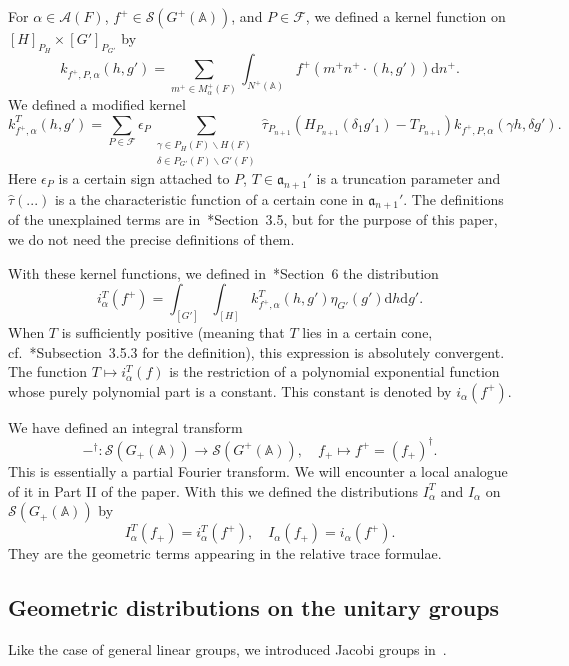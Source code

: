 \documentclass[letterpaper,11pt]{amsart}
\newcommand{\fa}{\mathfrak{a}}
\newcommand{\bA}{\mathbb{A}}
\newcommand{\cA}{\mathcal{A}}
\newcommand{\cF}{\mathcal{F}}
\newcommand{\cS}{\mathcal{S}}
\newcommand{\rd}{\mathrm{d}}
\newcommand{\bs}{\backslash}
\newcommand{\<}{\negthickspace}
\theoremstyle{definition}
\theoremstyle{plain}
\theoremstyle{remark}
\numberwithin{equation}{section}
\begin{document}
For
$\alpha \in \cA(F)$, $f^+ \in \cS(G^+(\bA))$, and $P \in \cF$,
we defined a kernel function on $[H]_{P_H} \times [G']_{P_{G'}}$ by
    \[
    k_{f^+, P, \alpha}(h,g')=
    \sum_{m^+ \in M^+_{\alpha}(F)}
    \int_{N^+(\bA)}
    f^+(m^+ n^+ \cdot (h,g'))
    \rd n^+.
    \]
We defined a modified kernel
    \[
    k_{f^+, \alpha}^T(h, g') = \sum_{P \in \cF} \epsilon_P
    \sum_{\substack{\gamma \in P_H(F) \bs H(F)\\
    \delta \in P_{G'}(F) \bs G'(F)}}
    \widehat{\tau}_{P_{n+1}}(H_{P_{n+1}}(\delta_1 g'_1) - T_{P_{n+1}})
    k_{f^+, P, \alpha}(\gamma h, \delta g').
    \]
Here $\epsilon_P$ is a certain sign attached to $P$, $T \in \fa_{n+1}'$ is a truncation parameter and $\widehat{\tau}(...)$ is a the characteristic function of a certain cone in $\fa_{n+1}'$. The definitions of the unexplained terms are in~\cite{BLX1}*{Section~3.5}, but for the purpose of this paper, we do not need the precise definitions of them.

With these kernel functions, we defined in~\cite{BLX1}*{Section~6} the distribution
    \[
    i_\alpha^T(f^+) = \int_{[G']} \int_{[H]} k^T_{f^+, \alpha}(h, g')
    \eta_{G'}(g') \rd h \rd g'.
    \]
When $T$ is sufficiently positive (meaning that $T$ lies in a certain cone, cf.~\cite{BLX1}*{Subsection~3.5.3} for the definition), this expression is absolutely convergent. The function $T \mapsto i^T_\alpha(f)$ is the restriction of a
polynomial exponential function whose purely polynomial part is a constant. This constant is denoted by $i_{\alpha}(f^+)$. 

We have defined an integral transform
    \[
    -^\dag: \cS(G_+(\bA)) \to \cS(G^+(\bA)), \quad f_+ \mapsto f^+ = (f_+)^{\dag}.
    \]
This is essentially a partial Fourier transform. We will encounter a local analogue of it in Part II of the paper. With this we defined the distributions
$I_{\alpha}^T$ and $I_{\alpha}$ on $\cS(G_+(\bA))$ by
    \[
    I_{\alpha}^T(f_+) = i_{\alpha}^T(f^+), \quad
    I_{\alpha}(f_+) = i_{\alpha}(f^+).
    \]
They are the geometric terms appearing in the relative trace formulae.





\subsection{Geometric distributions on the unitary groups}  \label{subsec:recall_U}

Like the case of general linear groups, we introduced Jacobi groups in~\cite{BLX1}.
\end{document}
